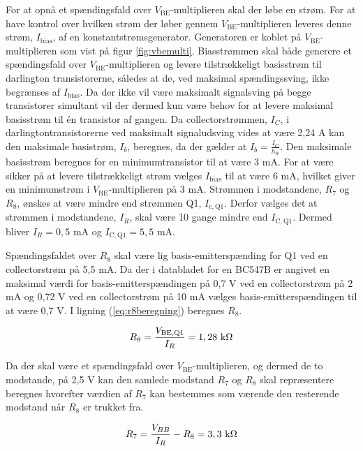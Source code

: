 For at opnå et spændingsfald over $V_\mathrm{BE}$-multiplieren skal der løbe en strøm. For at have kontrol over hvilken strøm der løber gennem $V_\mathrm{BE}$-multiplieren leveres denne strøm,  $I_\mathrm{bias}$, af en konstantstrømsgenerator. Generatoren er koblet på $V_\mathrm{BE}$-multiplieren som vist på figur \ref{fig:vbemulti}. Biasstrømmen skal både generere et spændingsfald over $V_\mathrm{BE}$-multiplieren og levere tilstrækkeligt basisstrøm til darlington transistorerne, således at de, ved maksimal spændingssving, ikke begrænses af $I_\mathrm{bias}$. Da der ikke vil være maksimalt signalsving på begge transistorer simultant vil der dermed kun være behov for at levere maksimal basisstrøm til én transistor af gangen. Da collectorstrømmen, $I_C$, i darlingtontransistorerne ved maksimalt signaludsving vides at være 2,24 A kan den maksimale basistrøm, $I_b$, beregnes, da der gælder at $I_b = \frac{I_C}{h_\mathrm{fe}}$. Den maksimale basisstrøm beregnes for en minimumtransistor til at være 3 mA. For at være sikker på at levere tilstrækkeligt strøm vælges $I_\mathrm{bias}$ til at være 6 mA, hvilket giver en minimumstrøm i $V_\mathrm{BE}$-multiplieren på 3 mA. Strømmen i modstandene, $R_7$ og $R_8$, ønskes at være mindre end strømmen Q1,  $I_\mathrm{c,Q1}$. Derfor vælges det at strømmen i modstandene,  $I_R$, skal være 10 gange mindre end $I_\mathrm{C,Q1}$. Dermed bliver $I_R = 0,5$ mA og $I_\mathrm{C,Q1} = 5,5$ mA.

Spændingsfaldet over $R_8$ skal være lig basis-emitterspænding for Q1 ved en collectorstrøm på 5,5 mA. Da der i databladet for en BC547B er angivet en maksimal værdi for basis-emitterspændingen på 0,7 V ved en collectorstrøm på 2 mA og 0,72 V ved en collectorstrøm på 10 mA vælges basis-emitterspændingen til at være 0,7 V. I ligning (\ref{eq:r8beregning}) beregnes $R_8$.

\begin{equation}
R_8 = \frac{V_\mathrm{BE,Q1}}{I_R} = 1,28~\mathrm{k}\ohm
\label{eq:r8beregning}
\end{equation}

Da der skal være et spændingsfald over $V_\mathrm{BE}$-multiplieren, og dermed de to modstande, på 2,5 V kan den samlede modstand $R_7$ og $R_8$ skal repræsentere beregnes hvorefter værdien af $R_7$ kan bestemmes som værende den resterende modstand når $R_8$ er trukket fra.

\begin{equation}
R_7 = \frac{V_{BB}}{I_R} - R_8 = 3,3~\mathrm{k}\ohm
\label{eq:r7beregning}
\end{equation}

